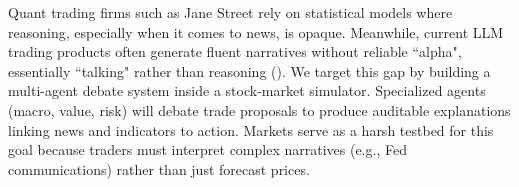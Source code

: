 \documentclass{article}
\begin{document}




Quant trading firms such as Jane Street rely on statistical models where reasoning, especially when it comes to news, is opaque.  Meanwhile, current LLM trading products often generate fluent narratives without reliable ``alpha", essentially ``talking" rather than reasoning (\cite{digitalalpha2025}). We target this gap by building a multi-agent debate system inside a stock-market simulator. Specialized agents (macro, value, risk) will debate trade proposals to produce auditable explanations linking news and indicators to action. Markets serve as a harsh testbed for this goal because traders must interpret complex narratives (e.g., Fed communications) rather than just forecast prices.
\end{document}
